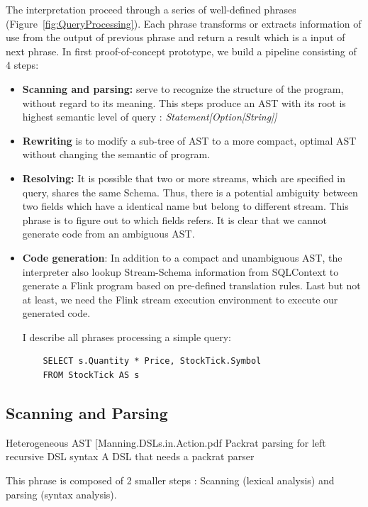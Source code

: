 The interpretation proceed through a series of well-defined phrases (Figure~\ref{fig:QueryProcessing}). Each phrase transforms or extracts information of use from the output of previous phrase and return a result which is a input of next phrase. In first proof-of-concept prototype, we build a pipeline consisting of 4 steps:
\begin{itemize}
	\item \textbf{Scanning and parsing:} serve to recognize the structure of the program, without regard to its meaning. This steps produce an AST with its root is highest semantic level of query : \textit{Statement[Option[String]]}

	\item \textbf{Rewriting} is to modify a sub-tree of AST to a more compact, optimal AST without changing the semantic of program.
	
	\item \textbf{Resolving:} It is possible that two or more streams, which are specified in query,  shares the same Schema. Thus, there is a potential ambiguity between two fields which have a identical name but belong to different stream. This phrase is to figure out to which fields refers. It is clear that we cannot generate code from an ambiguous AST.
	
	\item \textbf{Code generation}: In addition to a compact and unambiguous AST, the interpreter also lookup Stream-Schema information from SQLContext to generate a Flink program based on pre-defined translation rules. Last but not at least, we need the Flink stream execution environment to execute our generated code.
	
I describe all phrases processing a simple query: 
\begin{lstlisting}
	SELECT s.Quantity * Price, StockTick.Symbol 
	FROM StockTick AS s
\end{lstlisting}

\end{itemize}
\subsection{Scanning and Parsing}


 Heterogeneous AST
[Manning.DSLs.in.Action.pdf
Packrat parsing for left recursive DSL syntax
A DSL that needs a packrat parser


This phrase is composed of 2 smaller steps : Scanning (lexical analysis) and parsing (syntax analysis).


